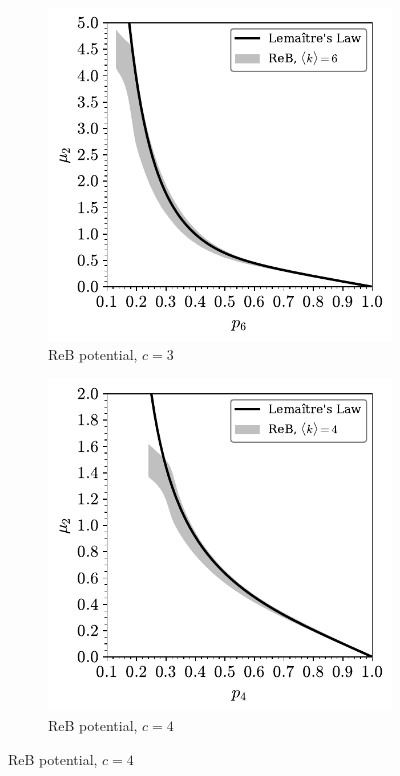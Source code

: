 \begin{figure}[bt]
     \begin{subfigure}[b]{0.45\textwidth}
         \centering
         \includegraphics[width=\textwidth]{./figures/general_networks/lemaitre_6.pdf}
         \caption{ReB potential, $c=3$}
         \label{fig:lmgenb}
     \end{subfigure}
     \hfill
     \begin{subfigure}[b]{0.45\textwidth}
         \centering
         \includegraphics[width=\textwidth]{./figures/general_networks/lemaitre_4.pdf}
         \caption{ReB potential, $c=4$}
         \label{fig:lmgenc}
     \end{subfigure}
     \hfill
 

\end{figure}
